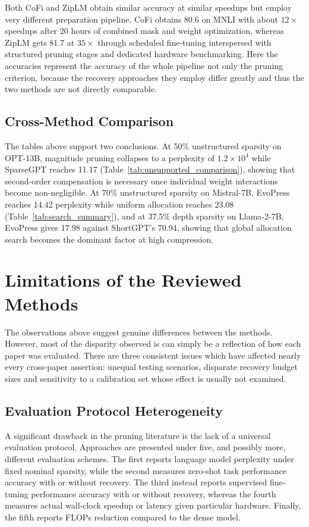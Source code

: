 Both CoFi and ZipLM obtain similar accuracy at similar speedups but employ very different preparation pipeline. CoFi obtains 80.6 on MNLI with about $12\times$ speedups after 20 hours of combined mask and weight optimization, whereas ZipLM gets 81.7 at $35\times$ through scheduled fine-tuning interspersed with structured pruning stages and dedicated hardware benchmarking. Here the accuracies represent the accuracy of the whole pipeline not only the pruning criterion, because the recovery approaches they employ differ greatly and thus the two methods are not directly comparable.

\subsection{Cross-Method Comparison}
\label{subsec:cross_method}

The tables above support two conclusions. At 50\% unstructured sparsity on OPT-13B, magnitude pruning collapses to a perplexity of $1.2\times10^4$ while SparseGPT reaches 11.17 (Table~\ref{tab:unsupported_comparison}), showing that second-order compensation is necessary once individual weight interactions become non-negligible. At 70\% unstructured sparsity on Mistral-7B, EvoPress reaches 14.42 perplexity while uniform allocation reaches 23.08 (Table~\ref{tab:search_summary}), and at 37.5\% depth sparsity on Llama-2-7B, EvoPress gives 17.98 against ShortGPT's 70.94, showing that global allocation search becomes the dominant factor at high compression.

\section{Limitations of the Reviewed Methods}
\label{sec:limitations}

 The observations above suggest genuine differences between the methods. However, most of the disparity observed is can simply be a reflection of how each paper was evaluated. There are three consistent issues which have affected nearly every cross-paper assertion: unequal testing scenarios, disparate recovery budget sizes and sensitivity to a calibration set whose effect is usually not examined.

\subsection{Evaluation Protocol Heterogeneity}
\label{subsec:eval_protocol}

A significant drawback in the pruning literature is the lack of a universal evaluation protocol. Approaches are presented under five, and possibly more, different evaluation schemes. The first reports language model perplexity under fixed nominal sparsity, while the second measures zero-shot task performance accuracy with or without recovery. The third instead reports supervised fine-tuning performance accuracy with or without recovery, whereas the fourth measures actual wall-clock speedup or latency given particular hardware. Finally, the fifth reports FLOPs reduction compared to the dense model.

